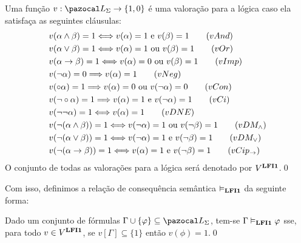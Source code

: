         \begin{definicao} \label{def:valoracoes}
            Uma função $v : \ling{} \to \{1, 0\}$ é uma valoração para a lógica \lfium{} caso ela satisfaça as seguintes cláusulas:
            \begin{align*}
                & v(\alpha \land \beta) = 1 \Longleftrightarrow v(\alpha) = 1 \text{ e } v(\beta) = 1\tag{\textbf{$vAnd$}}\label{val:vand}\\
                & v(\alpha \lor \beta) = 1 \Longleftrightarrow v(\alpha) = 1 \text{ ou } v(\beta) = 1\tag{\textbf{$vOr$}}\label{val:vor}\\
                & v(\alpha \to \beta) = 1 \Longleftrightarrow v(\alpha) = 0 \text{ ou } v(\beta) = 1\tag{\textbf{$vImp$}}\label{val:vimp}\\
                & v(\neg \alpha) = 0 \Longrightarrow v(\alpha) = 1\tag{\textbf{$vNeg$}}\label{val:vneg}\\
                & v(\circ \alpha) = 1 \Longrightarrow v(\alpha) = 0 \text{ ou } v(\neg \alpha) = 0\tag{\textbf{$vCon$}}\label{val:vcon}\\
                & v(\neg \circ \alpha) = 1 \Longrightarrow v(\alpha) = 1 \text{ e } v(\neg \alpha) = 1\tag{\textbf{$vCi$}}\label{val:vci}\\
                & v(\neg \neg \alpha) = 1 \Longleftrightarrow v(\alpha) = 1\tag{\textbf{$vDNE$}}\label{val:vdne}\\
                & v(\neg (\alpha \land \beta)) = 1 \Longleftrightarrow v(\neg \alpha) = 1 \text{ ou } v(\neg \beta) = 1\tag{\textbf{$vDM_{\land}$}}\label{val:vdmand}\\
                & v(\neg (\alpha \lor \beta)) = 1 \Longleftrightarrow v(\neg \alpha) = 1 \text{ e } v(\neg \beta) = 1\tag{\textbf{$vDM_{\lor}$}}\label{val:vdmor}\\
                & v(\neg (\alpha \to \beta)) = 1 \Longleftrightarrow v(\alpha) = 1 \text{ e } v(\neg \beta) = 1\tag{\textbf{$vCip_{\to}$}}\label{val:vcip}
            \end{align*}
            O conjunto de todas as valorações para a lógica \lfium{} será denotado por $V^{{\normalfont\textbf{LFI1}}{}}$.\qed{}
        \end{definicao}

        Com isso, definimos a relação de consequência semântica $\vDash_{{\normalfont\textbf{LFI1}}{}}$ da seguinte forma:

        \begin{definicao}\label{def:conval}
            Dado um conjunto de fórmulas $\Gamma \cup \{\phi\} \subseteq \ling{}$, tem-se $\Gamma \vDash_{{\normalfont\textbf{LFI1}}{}} \varphi$ sse, para todo $v \in V^{{\normalfont\textbf{LFI1}}{}}$, se $v[\Gamma] \subseteq \{1\}$ então $v(\phi) = 1$.\qed{}
        \end{definicao}


